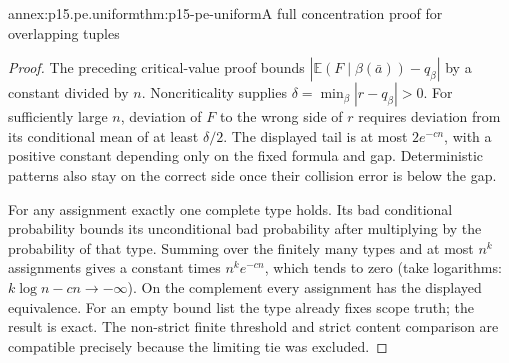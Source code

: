 \begin{annexitem}{annex:p15.pe.uniform}{thm:p15-pe-uniform}{A full concentration proof for overlapping tuples}
\begin{proof}
The preceding critical-value proof bounds
\(|\mathbb E(F\mid\beta(\bar a))-q_\beta|\) by a constant divided
by \(n\). Noncriticality supplies
\(\delta=\min_\beta|r-q_\beta|>0\). For sufficiently large \(n\),
deviation of \(F\) to the wrong side of \(r\) requires deviation
from its conditional mean of at least \(\delta/2\). The displayed
tail is at most \(2e^{-c n}\), with a positive constant depending
only on the fixed formula and gap. Deterministic patterns also
stay on the correct side once their collision error is below the gap.

For any assignment exactly one complete type holds. Its bad conditional
probability bounds its unconditional bad probability after multiplying
by the probability of that type. Summing over the finitely many types
and at most \(n^k\) assignments gives a constant times \(n^ke^{-cn}\),
which tends to zero (take logarithms: \(k\log n-cn\to-\infty\)).
On the complement every assignment has the displayed equivalence.
For an empty bound list the type already fixes scope truth; the result
is exact. The non-strict finite threshold and strict content comparison
are compatible precisely because the limiting tie was excluded.
\end{proof}
\end{annexitem}


